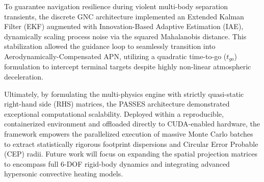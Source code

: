 \documentclass[11pt,a4paper]{article}
\theoremstyle{definition}
\numberwithin{equation}{section}
\begin{document}
To guarantee navigation resilience during violent multi-body separation transients, the discrete GNC architecture implemented an Extended Kalman Filter (EKF) augmented with Innovation-Based Adaptive Estimation (IAE), dynamically scaling process noise via the squared Mahalanobis distance. This stabilization allowed the guidance loop to seamlessly transition into Aerodynamically-Compensated APN, utilizing a quadratic time-to-go ($t_{go}$) formulation to intercept terminal targets despite highly non-linear atmospheric deceleration. 

Ultimately, by formulating the multi-physics engine with strictly quasi-static right-hand side (RHS) matrices, the PASSES architecture demonstrated exceptional computational scalability. Deployed within a reproducible, containerized environment and offloaded directly to CUDA-enabled hardware, the framework empowers the parallelized execution of massive Monte Carlo batches to extract statistically rigorous footprint dispersions and Circular Error Probable (CEP) radii. Future work will focus on expanding the spatial projection matrices to encompass full 6-DOF rigid-body dynamics and integrating advanced hypersonic convective heating models.


\pagebreak

\printbibliography

\pagebreak
\end{document}
